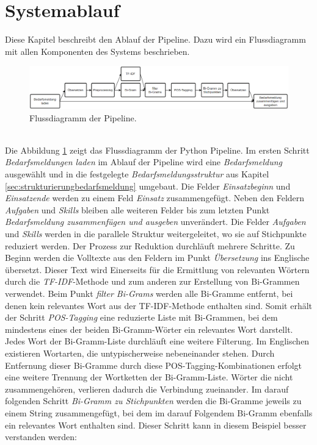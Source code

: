 \section{Systemablauf}
Diese Kapitel beschreibt den Ablauf der Pipeline. Dazu wird ein Flussdiagramm mit allen Komponenten des Systems beschrieben.
\begin{figure}[H]
	\centering  
	\includegraphics[width=\linewidth]{Abbildungen/flowchart.png}
	\caption{Flussdiagramm der Pipeline.}
	\label{fig:flowchart}
\end{figure}\mbox{} \\
Die Abbildung \ref{fig:flowchart} zeigt das Flussdiagramm der Python Pipeline. Im ersten Schritt \emph{Bedarfsmeldungen laden} im Ablauf der Pipeline wird eine \emph{Bedarfsmeldung} ausgewählt und in die festgelegte \emph{Bedarfsmeldungsstruktur} aus Kapitel \ref{sec:strukturierungbedarfsmeldung} umgebaut. Die Felder \emph{Einsatzbeginn} und \emph{Einsatzende} werden zu einem Feld \emph{Einsatz} zusammengefügt. Neben den Feldern \emph{Aufgaben} und \emph{Skills} bleiben alle weiteren Felder bis zum letzten Punkt \emph{Bedarfsmeldung zusammenfügen und ausgeben} unverändert. Die Felder \emph{Aufgaben} und \emph{Skills} werden in die parallele Struktur weitergeleitet, wo sie auf Stichpunkte reduziert werden. Der Prozess zur Reduktion durchläuft mehrere Schritte. Zu Beginn werden die Volltexte aus den Feldern im Punkt \emph{Übersetzung} ins Englische übersetzt. Dieser Text wird Einerseits für die Ermittlung von relevanten Wörtern durch die \emph{TF-IDF}-Methode und zum anderen zur Erstellung von Bi-Grammen verwendet. Beim Punkt \emph{filter Bi-Grams} werden alle Bi-Gramme entfernt, bei denen kein relevantes Wort aus der TF-IDF-Methode enthalten sind. Somit erhält der Schritt \emph{POS-Tagging} eine reduzierte Liste mit Bi-Grammen, bei dem mindestens eines der beiden Bi-Gramm-Wörter ein relevantes Wort darstellt. Jedes Wort der Bi-Gramm-Liste durchläuft eine weitere Filterung. Im Englischen existieren Wortarten, die untypischerweise nebeneinander stehen. Durch Entfernung dieser Bi-Gramme durch diese POS-Tagging-Kombinationen erfolgt eine weitere Trennung der Wortketten der Bi-Gramm-Liste. Wörter die nicht zusammengehören, verlieren dadurch die Verbindung zueinander. Im darauf folgenden Schritt \emph{Bi-Gramm zu Stichpunkten} werden die Bi-Gramme jeweils zu einem String zusammengefügt, bei dem im darauf Folgendem Bi-Gramm ebenfalls ein relevantes Wort enthalten sind. Dieser Schritt kann in diesem Beispiel besser verstanden werden:\\
